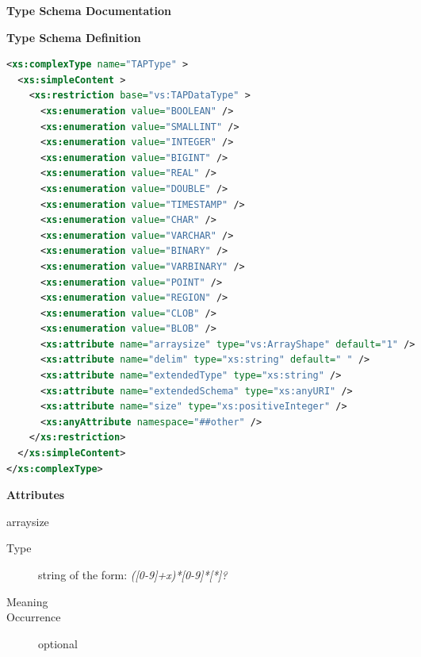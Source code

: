 \documentclass[11pt,a4paper]{ivoa}
\begin{document}
\begin{generated}
\begingroup
      	\renewcommand*\descriptionlabel[1]{%
      	\hbox to 5.5em{\emph{#1}\hfil}}\vspace{2ex}\noindent\textbf{ Type Schema Documentation}


\vspace{1ex}\noindent\textbf{ Type Schema Definition}

\begin{lstlisting}[language=XML,basicstyle=\footnotesize]
<xs:complexType name="TAPType" >
  <xs:simpleContent >
    <xs:restriction base="vs:TAPDataType" >
      <xs:enumeration value="BOOLEAN" />
      <xs:enumeration value="SMALLINT" />
      <xs:enumeration value="INTEGER" />
      <xs:enumeration value="BIGINT" />
      <xs:enumeration value="REAL" />
      <xs:enumeration value="DOUBLE" />
      <xs:enumeration value="TIMESTAMP" />
      <xs:enumeration value="CHAR" />
      <xs:enumeration value="VARCHAR" />
      <xs:enumeration value="BINARY" />
      <xs:enumeration value="VARBINARY" />
      <xs:enumeration value="POINT" />
      <xs:enumeration value="REGION" />
      <xs:enumeration value="CLOB" />
      <xs:enumeration value="BLOB" />
      <xs:attribute name="arraysize" type="vs:ArrayShape" default="1" />
      <xs:attribute name="delim" type="xs:string" default=" " />
      <xs:attribute name="extendedType" type="xs:string" />
      <xs:attribute name="extendedSchema" type="xs:anyURI" />
      <xs:attribute name="size" type="xs:positiveInteger" />
      <xs:anyAttribute namespace="##other" />
    </xs:restriction>
  </xs:simpleContent>
</xs:complexType>
\end{lstlisting}

\vspace{0.5ex}\noindent\textbf{ Attributes}

\begingroup\small\begin{bigdescription}
\item[arraysize]
\begin{description}
\item[Type] string of the form: \emph{([0-9]+x)*[0-9]*[*]?}
\item[Meaning] 
\item[Occurrence] optional


\end{description}
\end{bigdescription}
\end{generated}
\end{document}
